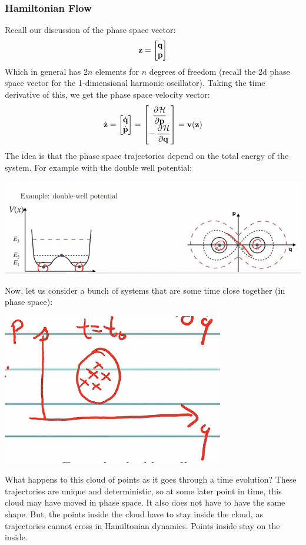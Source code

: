 \documentclass[../PHYS306Notes.tex]{subfiles}
\begin{document}
\subsubsection{Hamiltonian Flow}
Recall our discussion of the phase space vector:
\[\mathbf{z} = \begin{bmatrix}\mathbf{q} \\ \mathbf{p}\end{bmatrix}\]
Which in general has $2n$ elements for $n$ degrees of freedom (recall the 2d phase space vector for the 1-dimensional harmonic oscillator). Taking the time derivative of this, we get the phase space velocity vector:
\[\dot{\v{z}} = \m{\dot{\v{q}} \\ \dot{\v{p}}} = \m{\dpd{\HH}{\v{p}} \\ -\dpd{\HH}{\v{q}}} = \v{v}(\v{z})\]
The idea is that the phase space trajectories depend on the total energy of the system. For example with the double well potential:
\begin{center}
    \includegraphics[scale=0.8]{Lecture-25/l25-img1.png}
\end{center}
Now, let us consider a bunch of systems that are some time close together (in phase space):
\begin{center}
    \includegraphics[scale=0.8]{Lecture-25/l25-img2.png}
\end{center}
What happens to this cloud of points as it goes through a time evolution? These trajectories are unique and deterministic, so at some later point in time, this cloud may have moved in phase space. It also does not have to have the same shape. But, the points inside the cloud have to stay inside the cloud, as trajectories cannot cross in Hamiltonian dynamics. Points inside stay on the inside.
\end{document}
